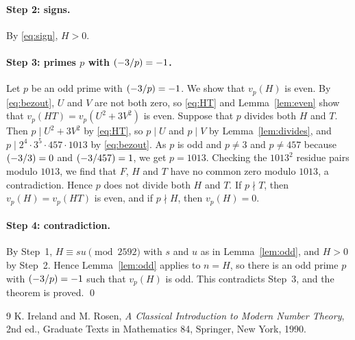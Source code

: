 \documentclass[11pt]{article}
\newcommand{\leg}[2]{\mathchoice{\biggl(\dfrac{#1}{#2}\biggr)}{(#1/#2)}{(#1/#2)}{(#1/#2)}}
\begin{document}
\paragraph{Step 2: signs.} By \eqref{eq:sign}, $H>0$.

\paragraph{\texorpdfstring{Step 3: primes $p$ with $\leg{-3}{p}=-1$.}{Step 3: inert primes.}} Let $p$ be an odd prime with $\leg{-3}{p}=-1$. We show that $v_p(H)$ is even. By \eqref{eq:bezout}, $U$ and $V$ are not both zero, so \eqref{eq:HT} and Lemma~\ref{lem:even} show that $v_p(HT)=v_p(U^2+3V^2)$ is even. Suppose that $p$ divides both $H$ and $T$. Then $p\mid U^2+3V^2$ by \eqref{eq:HT}, so $p\mid U$ and $p\mid V$ by Lemma~\ref{lem:divides}, and $p\mid 2^{4}\cdot 3^{5}\cdot 457\cdot 1013$ by \eqref{eq:bezout}. As $p$ is odd and $p\neq3$ and $p\neq457$ because $\leg{-3}{3}=0$ and $\leg{-3}{457}=1$, we get $p=1013$. Checking the $1013^2$ residue pairs modulo $1013$, we find that $F$, $H$ and $T$ have no common zero modulo $1013$, a contradiction. Hence $p$ does not divide both $H$ and $T$. If $p\nmid T$, then $v_p(H)=v_p(HT)$ is even, and if $p\nmid H$, then $v_p(H)=0$.

\paragraph{Step 4: contradiction.} By Step~1, $H\equiv su\pmod{2592}$ with $s$ and $u$ as in Lemma~\ref{lem:odd}, and $H>0$ by Step~2. Hence Lemma~\ref{lem:odd} applies to $n=H$, so there is an odd prime $p$ with $\leg{-3}{p}=-1$ such that $v_p(H)$ is odd. This contradicts Step~3, and the theorem is proved.
\qed

\begin{thebibliography}{9}
 K. Ireland and M. Rosen, \emph{A Classical Introduction to Modern Number Theory}, 2nd ed., Graduate Texts in Mathematics 84, Springer, New York, 1990.
\end{thebibliography}
\end{document}
